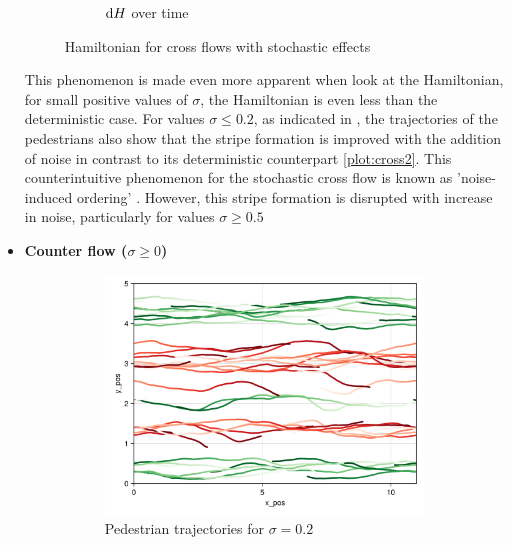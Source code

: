 \begin{itemize}
\begin{figure}[H]
\begin{subfigure}{.49\textwidth}
            \caption{$\mathrm d H$ over time}
            \label{plot:stoc_cross_dh}
        \end{subfigure}
        \caption{Hamiltonian for cross flows with stochastic effects}
        \label{plot:stoc_cross_hamiltonian}
    \end{figure}
This phenomenon is made even more apparent when look at the Hamiltonian, for small positive values of $\sigma$, the Hamiltonian is even less than the deterministic case. For values $\sigma \leq 0.2$, as indicated in \cite{khelfa2021initiating}, the trajectories of the pedestrians also show that the stripe formation is improved with the addition of noise in contrast to its deterministic counterpart \autoref{plot:cross2}. This counterintuitive phenomenon for the stochastic cross flow is known as 'noise-induced ordering' \cite{d2021canard}. However, this stripe formation is disrupted with increase in noise, particularly for values $\sigma \geq 0.5$
    \item \textbf{Counter flow ($\sigma \geq 0$)}
    \begin{figure}[H]
        \centering
        \begin{subfigure}{.49\textwidth}
            \centering
            \includegraphics[width=\linewidth]{figures/ch5_collective_stoch/traj_stochastic_counter_10000.png}
            \caption{Pedestrian trajectories for $\sigma = 0.2$}
            \label{plot:stoc_counter_traj}
        \end{subfigure}
        \begin{subfigure}{.49\textwidth}
            \centering

\end{subfigure}
\end{figure}
\end{itemize}
